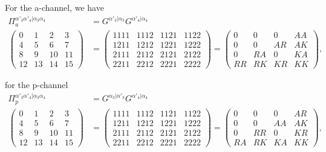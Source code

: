 \documentclass[12pt,a4paper,roman]{article}
\begin{document}
For the a-channel, we have
\begin{align}
\Pi_a^{\alpha'_3\alpha'_4|\alpha_3\alpha_4} &= G^{\alpha'_3|\alpha_3}G^{\alpha'_4|\alpha_4}\\
\begin{pmatrix}
0  & 1  & 2   & 3\\
4  & 5  & 6   & 7\\
8  & 9  & 10 & 11\\
12& 13&14 & 15
\end{pmatrix} &=
\begin{pmatrix}
1111 & 1112 & 1121 & 1122 \\
1211 & 1212 & 1221 & 1222\\
2111 & 2112 & 2121 & 2122\\
2211& 2212 & 2221 & 2222
\end{pmatrix} = \begin{pmatrix}
0    & 0    & 0    & AA \\
0    & 0    & AR & AK\\
0    & RA & 0    & KA\\
RR & RK & KR & KK
\end{pmatrix},
\end{align}

for the p-channel
\begin{align}
\Pi_p^{\alpha'_3\alpha'_4|\alpha_3\alpha_4} &= G^{\alpha_3|\alpha'_3}G^{\alpha'_4|\alpha_4}\\
\begin{pmatrix}
0  & 1  & 2   & 3\\
4  & 5  & 6   & 7\\
8  & 9  & 10 & 11\\
12& 13&14 & 15
\end{pmatrix} &=
\begin{pmatrix}
1111 & 1112 & 1121 & 1122 \\
1211 & 1212 & 1221 & 1222\\
2111 & 2112 & 2121 & 2122\\
2211& 2212 & 2221 & 2222
\end{pmatrix} = \begin{pmatrix}
0    & 0    & 0    & AR \\
0    & 0    & AA & AK\\
0    & RR & 0    & KR\\
RA & RK & KA & KK
\end{pmatrix},
\end{align}
\end{document}
